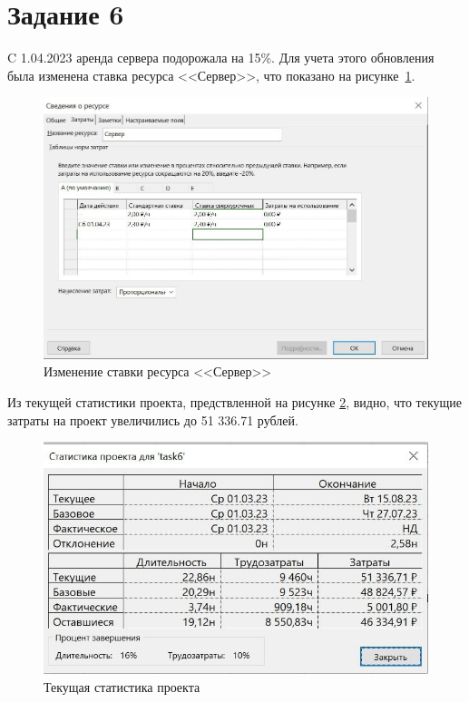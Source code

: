 \section*{Задание 6}

C 1.04.2023 аренда сервера подорожала на 15\%. Для учета этого обновления была изменена ставка ресурса <<Сервер>>, что показано на рисунке~\ref{img:task6}.

\begin{figure}[H]
	\begin{center}
		\includegraphics[scale=0.25]{inc/img/task6.jpg}
	\end{center}
	\captionsetup{justification=centering}
	\caption{Изменение ставки ресурса <<Сервер>>}
	\label{img:task6}
\end{figure}

Из текущей статистики проекта, предствленной на рисунке \ref{img:task6-stat}, видно, что текущие затраты на проект увеличились до 51 336.71 рублей.

\begin{figure}[H]
	\begin{center}
		\includegraphics[scale=0.3]{inc/img/task6-stat.jpg}
	\end{center}
	\captionsetup{justification=centering}
	\caption{Текущая статистика проекта}
	\label{img:task6-stat}
\end{figure}

